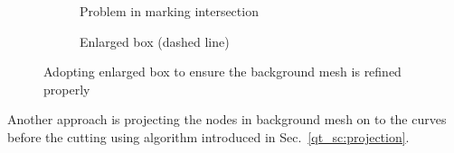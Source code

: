 \begin{figure}
    \begin{subfigure}[b]{0.5\linewidth}
        \centering
        \caption{Problem in marking intersection}
        \label{qdt_fig:qdt_cutting_point_moving_problem}
    \end{subfigure}
    \begin{subfigure}[b]{0.5\linewidth}
        \centering
        \caption{Enlarged box (dashed line)}
        \label{qdt_fig:qdt_cutting_enlarged_box}
    \end{subfigure}
    \caption[Problem in marking intersection]{Adopting enlarged box to ensure the background mesh is refined properly}
    \label{qdt_fig:qdt_cutting_enlarged_box_point_moving_problem}
\end{figure}
Another approach is projecting the nodes in background mesh on to the curves before the cutting using algorithm introduced in Sec.~\ref{qt_sc:projection}.
